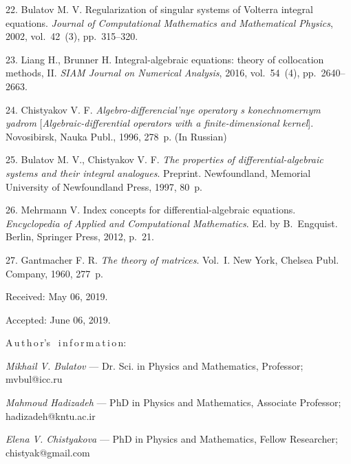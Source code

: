 {22. Bulatov M. V.  Regularization of singular systems of Volterra
integral equations. {\it Journal of Computational Mathematics and
Mathematical  Physics}, 2002, vol.~42~(3), pp.~315--320.

23. Liang H., Brunner H. Integral-algebraic equations: theory of
collocation methods, II.  {\it SIAM  Journal on Numerical
Analysis}, 2016, vol.~54~(4), pp.~2640--2663.

24. Chistyakov V. F. {\it Algebro-differencial'nye operatory s
konechnomernym yadrom} [{\it Al\-ge\-braic-differential operators
with a finite-dimensional kernel}]. Novosibirsk, Nauka Publ.,
1996, 278~p. (In Russian)

25. Bulatov M. V., Chistyakov V. F. {\it The properties of
differential-algebraic systems and their integral analogues}.
Preprint. Newfoundland,  Memorial University of Newfoundland
Press, 1997, 80~p.

26. Mehrmann V.  Index concepts for differential-algebraic
equations. {\it Encyclopedia of Applied and Computational
Mathematics}. Ed. by B.~Engquist. Berlin, Springer Press, 2012,
p.~21.

27. Gantmacher  F. R. {\it The theory of matrices}. Vol.~I. New
York, Chelsea Publ. Company, 1960, 277~p.


\vskip 1.5mm

%


Received:  May 06, 2019.

Accepted: June 06, 2019.

\vskip 4.5mm%
A\,u\,t\,h\,o\,r's \ i\,n\,f\,o\,r\,m\,a\,t\,i\,o\,n:

\vskip 1.5mm%
\textit{Mikhail V. Bulatov} --- Dr. Sci. in Physics
and Mathematics, Professor; mvbul@icc.ru

\vskip 1.5mm%
\textit{Mahmoud Hadizadeh} --- PhD in Physics and Mathematics,
Associate Professor; hadizadeh@kntu.ac.ir

\vskip 1.5mm%
\textit{Elena V. Chistyakova} --- PhD in Physics and Mathematics,
Fellow Researcher; chistyak@gmail.com

}
